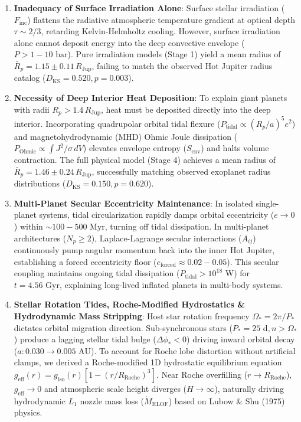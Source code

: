 \begin{enumerate}
    \item \textbf{Inadequacy of Surface Irradiation Alone}:
    Surface stellar irradiation ($F_{\mathrm{inc}}$) flattens the radiative atmospheric temperature gradient at optical depth $\tau \sim 2/3$, retarding Kelvin-Helmholtz cooling. However, surface irradiation alone cannot deposit energy into the deep convective envelope ($P > 1 - 10\text{ bar}$). Pure irradiation models (Stage 1) yield a mean radius of $\bar{R}_p = 1.15 \pm 0.11\,R_{\mathrm{Jup}}$, failing to match the observed Hot Jupiter radius catalog ($D_{\mathrm{KS}} = 0.520, p = 0.003$).

    \item \textbf{Necessity of Deep Interior Heat Deposition}:
    To explain giant planets with radii $R_p > 1.4\,R_{\mathrm{Jup}}$, heat must be deposited directly into the deep interior. Incorporating quadrupolar orbital tidal flexure ($P_{\mathrm{tidal}} \propto (R_p/a)^5 e^2$) and magnetohydrodynamic (MHD) Ohmic Joule dissipation ($P_{\mathrm{Ohmic}} \propto \int J^2/\sigma\,dV$) elevates envelope entropy ($S_{\mathrm{env}}$) and halts volume contraction. The full physical model (Stage 4) achieves a mean radius of $\bar{R}_p = 1.46 \pm 0.24\,R_{\mathrm{Jup}}$, successfully matching observed exoplanet radius distributions ($D_{\mathrm{KS}} = 0.150, p = 0.620$).

    \item \textbf{Multi-Planet Secular Eccentricity Maintenance}:
    In isolated single-planet systems, tidal circularization rapidly damps orbital eccentricity ($e \to 0$) within $\sim 100 - 500\text{ Myr}$, turning off tidal dissipation. In multi-planet architectures ($N_p \ge 2$), Laplace-Lagrange secular interactions ($A_{ij}$) continuously pump angular momentum back into the inner Hot Jupiter, establishing a forced eccentricity floor ($e_{\mathrm{forced}} \approx 0.02 - 0.05$). This secular coupling maintains ongoing tidal dissipation ($P_{\mathrm{tidal}} > 10^{18}\text{ W}$) for $t = 4.56\text{ Gyr}$, explaining long-lived inflated planets in multi-body systems.

    \item \textbf{Stellar Rotation Tides, Roche-Modified Hydrostatics \& Hydrodynamic Mass Stripping}:
    Host star rotation frequency $\Omega_* = 2\pi/P_*$ dictates orbital migration direction. Sub-synchronous stars ($P_* = 25\text{ d}, n > \Omega_*$) produce a lagging stellar tidal bulge ($\Delta\phi_* < 0$) driving inward orbital decay ($a: 0.030 \to 0.005\text{ AU}$). To account for Roche lobe distortion without artificial clamps, we derived a Roche-modified 1D hydrostatic equilibrium equation $g_{\mathrm{eff}}(r) = g_{\mathrm{iso}}(r)[1 - (r/R_{\mathrm{Roche}})^3]$. Near Roche overfilling ($r \to R_{\mathrm{Roche}}$), $g_{\mathrm{eff}} \to 0$ and atmospheric scale height diverges ($H \to \infty$), naturally driving hydrodynamic $L_1$ nozzle mass loss ($\dot{M}_{\mathrm{RLOF}}$) based on Lubow \& Shu (1975) physics.


\end{enumerate}
